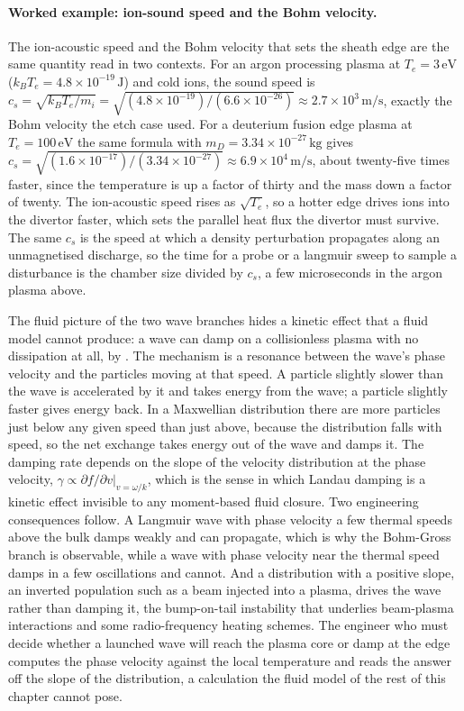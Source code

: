 \paragraph{Worked example: ion-sound speed and the Bohm velocity.}
The ion-acoustic speed and the Bohm velocity that sets the sheath edge are the
same quantity read in two contexts. For an argon processing plasma at $T_e =
3\,\si{\electronvolt}$ ($k_B T_e = 4.8\times 10^{-19}\,\si{\joule}$) and cold
ions, the sound speed is $c_s = \sqrt{k_B T_e/m_i} = \sqrt{(4.8\times
10^{-19})/(6.6\times 10^{-26})} \approx 2.7\times 10^{3}\,\si{\meter\per
\second}$, exactly the Bohm velocity the etch case used. For a deuterium fusion
edge plasma at $T_e = 100\,\si{\electronvolt}$ the same formula with $m_D =
3.34\times 10^{-27}\,\si{\kilogram}$ gives $c_s = \sqrt{(1.6\times
10^{-17})/(3.34\times 10^{-27})} \approx 6.9\times 10^{4}\,\si{\meter\per
\second}$, about twenty-five times faster, since the temperature is up a factor
of thirty and the mass down a factor of twenty. The ion-acoustic speed rises as
$\sqrt{T_e}$, so a hotter edge drives ions into the divertor faster, which sets
the parallel heat flux the divertor must survive. The same $c_s$ is the speed
at which a density perturbation propagates along an unmagnetised discharge, so
the time for a probe or a langmuir sweep to sample a disturbance is the chamber
size divided by $c_s$, a few microseconds in the argon plasma above.

\begin{mastery}
The fluid picture of the two wave branches hides a kinetic effect that a fluid
model cannot produce: a wave can damp on a collisionless plasma with no
dissipation at all, by . The mechanism is a resonance
between the wave's phase velocity and the particles moving at that speed. A
particle slightly slower than the wave is accelerated by it and takes energy
from the wave; a particle slightly faster gives energy back. In a Maxwellian
distribution there are more particles just below any given speed than just
above, because the distribution falls with speed, so the net exchange takes
energy out of the wave and damps it. The damping rate depends on the slope of
the velocity distribution at the phase velocity, $\gamma \propto \partial f/
\partial v|_{v=\omega/k}$, which is the sense in which Landau damping is a
kinetic effect invisible to any moment-based fluid closure. Two engineering
consequences follow. A Langmuir wave with phase velocity a few thermal speeds
above the bulk damps weakly and can propagate, which is why the Bohm-Gross
branch is observable, while a wave with phase velocity near the thermal speed
damps in a few oscillations and cannot. And a distribution with a positive
slope, an inverted population such as a beam injected into a plasma, drives the
wave rather than damping it, the bump-on-tail instability that underlies
beam-plasma interactions and some radio-frequency heating schemes. The engineer
who must decide whether a launched wave will reach the plasma core or damp at
the edge computes the phase velocity against the local temperature and reads the
answer off the slope of the distribution, a calculation the fluid model of the
rest of this chapter cannot pose.
\end{mastery}

